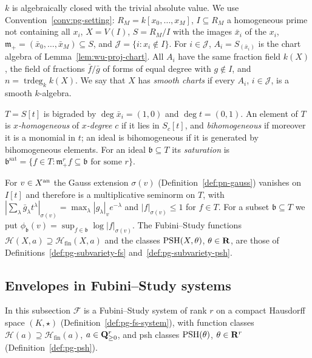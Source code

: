 \begin{convention}\label{conv:sg-setting}
$k$ is algebraically closed with the trivial absolute value. We use Convention~\ref{conv:pg-setting}: $R_M=k[x_0,\dots,x_M]$,
$I\subseteq R_M$ a homogeneous prime not containing all $x_i$, $X=V(I)$, $S=R_M/I$ with the images $\bar x_i$ of the $x_i$,
$\mathfrak m_+=(\bar x_0,\dots,\bar x_M)\subseteq S$, and $\mathcal J=\{i:x_i\notin I\}$. For $i\in\mathcal J$,
$A_i=S_{(\bar x_i)}$ is the chart algebra of Lemma~\ref{lem:wu-proj-chart}. All $A_i$ have the same fraction field
$k(X)$, the field of fractions $\bar f/\bar g$ of forms of equal degree with $g\notin I$, and $n=\operatorname{trdeg}_kk(X)$.
We say that $X$ has \emph{smooth charts} if every $A_i$, $i\in\mathcal J$, is a smooth $k$-algebra.

$T=S[t]$ is bigraded by $\deg\bar x_i=(1,0)$ and $\deg t=(0,1)$. An element of $T$ is \emph{$x$-homogeneous} of
\emph{$x$-degree} $c$ if it lies in $S_c[t]$, and \emph{bihomogeneous} if moreover it is a monomial in $t$; an ideal is
bihomogeneous if it is generated by bihomogeneous elements. For an ideal $\mathfrak b\subseteq T$ its \emph{saturation}
is $\mathfrak b^{\mathrm{sat}}=\{f\in T:\mathfrak m_+^rf\subseteq\mathfrak b\text{ for some }r\}$.

For $v\in X^{\mathrm{an}}$ the Gauss extension $\sigma(v)$ (Definition~\ref{def:pn-gauss}) vanishes on $I[t]$ and therefore is a
multiplicative seminorm on $T$, with $|\sum_\lambda\bar g_\lambda t^\lambda|_{\sigma(v)}=\max_\lambda|g_\lambda|_ve^{-\lambda}$ and
$|f|_{\sigma(v)}\le1$ for $f\in T$. For a subset $\mathfrak b\subseteq T$ we put
$\phi_{\mathfrak b}(v)=\sup_{f\in\mathfrak b}\log|f|_{\sigma(v)}$. The Fubini--Study functions $\mathcal H(X,a)\supseteq\mathcal H_{\mathrm{fin}}(X,a)$
and the classes $\operatorname{PSH}(X,\theta)$, $\theta\in\mathbf{R}$, are those of Definitions~\ref{def:pg-subvariety-fs}
and~\ref{def:pg-subvariety-psh}.
\end{convention}

\subsection{Envelopes in Fubini--Study systems}\label{subsec:sg-envelopes}

In this subsection $\mathcal F$ is a Fubini--Study system of rank $r$ on a compact Hausdorff space $(K,\star)$
(Definition~\ref{def:pg-fs-system}), with function classes $\mathcal H(a)\supseteq\mathcal H_{\mathrm{fin}}(a)$, $a\in\mathbf{Q}^r_{\ge0}$, and
psh classes $\operatorname{PSH}(\theta)$, $\theta\in\mathbf{R}^r$ (Definition~\ref{def:pg-psh}).

